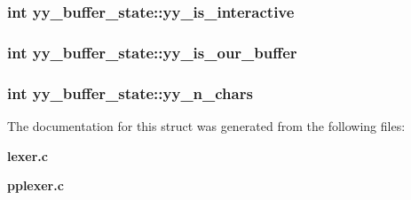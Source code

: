 \subsubsection{\setlength{\rightskip}{0pt plus 5cm}int yy\_\-buffer\_\-state::yy\_\-is\_\-interactive}\label{structyy__buffer__state_m6}


\subsubsection{\setlength{\rightskip}{0pt plus 5cm}int yy\_\-buffer\_\-state::yy\_\-is\_\-our\_\-buffer}\label{structyy__buffer__state_m5}


\subsubsection{\setlength{\rightskip}{0pt plus 5cm}int yy\_\-buffer\_\-state::yy\_\-n\_\-chars}\label{structyy__buffer__state_m4}




The documentation for this struct was generated from the following files:\begin{CompactItemize}
\item 
{\bf lexer.c}\item 
{\bf pplexer.c}\end{CompactItemize}
